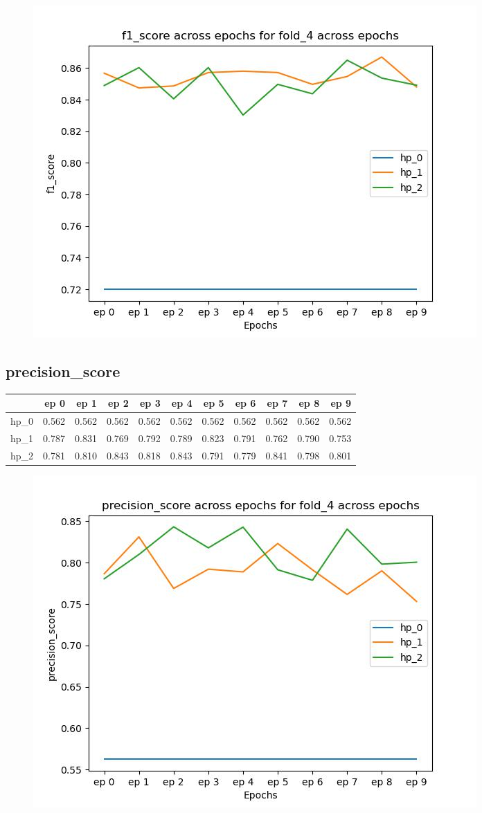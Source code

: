 \documentclass{article}
\begin{document}
\begin{figure}[H]
\includegraphics[scale = 0.75]{fold_4/f1_score}
\end{figure}
\subsection{precision\_score}
\begin{tabular}{lrrrrrrrrrr}
\toprule
{} &   ep 0 &   ep 1 &   ep 2 &   ep 3 &   ep 4 &   ep 5 &   ep 6 &   ep 7 &   ep 8 &   ep 9 \\
\midrule
hp\_0 &  0.562 &  0.562 &  0.562 &  0.562 &  0.562 &  0.562 &  0.562 &  0.562 &  0.562 &  0.562 \\
hp\_1 &  0.787 &  0.831 &  0.769 &  0.792 &  0.789 &  0.823 &  0.791 &  0.762 &  0.790 &  0.753 \\
hp\_2 &  0.781 &  0.810 &  0.843 &  0.818 &  0.843 &  0.791 &  0.779 &  0.841 &  0.798 &  0.801 \\
\bottomrule
\end{tabular}

\begin{figure}[H]
\includegraphics[scale = 0.75]{fold_4/precision_score}
\end{figure}
\end{document}
